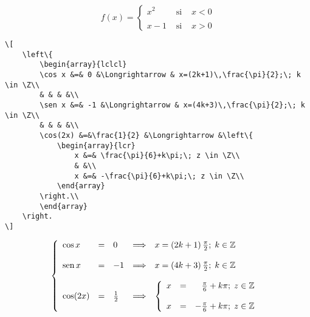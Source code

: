 \documentclass[a4,10pt]{aleph-notas}
\newcommand{\Z}{\mathbb{Z}}
\theoremstyle{definition}
\theoremstyle{plain}
\begin{document}
\[
    f(x)= \left\{ 
            \begin{array}{lcl}
                x^2 & \mbox{ si } & x<0 \\
                & & \\
                x-1 & \mbox{ si } & x>0
            \end{array}
        \right.
\]

\begin{lstlisting}[frame=single]
\[
    \left\{
        \begin{array}{lclcl}
        \cos x &=& 0 &\Longrightarrow & x=(2k+1)\,\frac{\pi}{2};\; k \in \Z\\
        & & & &\\
        \sen x &=& -1 &\Longrightarrow & x=(4k+3)\,\frac{\pi}{2};\; k \in \Z\\
        & & & &\\
        \cos(2x) &=&\frac{1}{2} &\Longrightarrow &\left\{
            \begin{array}{lcr}
                x &=& \frac{\pi}{6}+k\pi;\; z \in \Z\\
                & &\\
                x &=& -\frac{\pi}{6}+k\pi;\; z \in \Z\\
            \end{array}
        \right.\\
        \end{array}
    \right.
\]
\end{lstlisting}

\[
    \left\{
        \begin{array}{lclcl}
        \cos x &=& 0 &\Longrightarrow & x=(2k+1)\,\frac{\pi}{2};\; k \in \Z\\
        & & & &\\
        \sen x &=& -1 &\Longrightarrow & x=(4k+3)\,\frac{\pi}{2};\; k \in \Z\\
        & & & &\\
        \cos(2x) &=&\frac{1}{2} &\Longrightarrow &\left\{
            \begin{array}{lcr}
                x &=& \frac{\pi}{6}+k\pi;\; z \in \Z\\
                & &\\
                x &=& -\frac{\pi}{6}+k\pi;\; z \in \Z\\
            \end{array}
        \right.\\
        \end{array}
    \right.
\]
\end{document}
